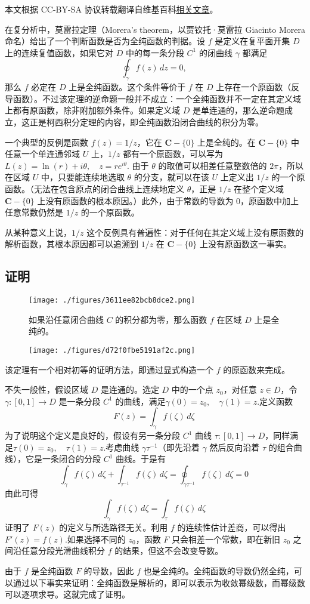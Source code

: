 
本文根据 CC-BY-SA 协议转载翻译自维基百科\href{https://en.wikipedia.org/wiki/Morera\%27s_theorem}{相关文章}。

在复分析中，莫雷拉定理（Morera's theorem，以贾钦托·莫雷拉 Giacinto Morera 命名）给出了一个判断函数是否为全纯函数的判据。设 $f$ 是定义在复平面开集 $D$ 上的连续复值函数，如果它对 $D$ 中的每一条分段 $C^1$ 的闭曲线 $\gamma$ 都满足
$$
\oint_{\gamma} f(z)\,dz = 0,~
$$
那么 $f$ 必定在 $D$ 上是全纯函数。这个条件等价于 $f$ 在 $D$ 上存在一个原函数（反导函数）。不过该定理的逆命题一般并不成立：一个全纯函数并不一定在其定义域上都有原函数，除非附加额外条件。如果定义域 $D$ 是单连通的，那么逆命题成立，这正是柯西积分定理的内容，即全纯函数沿闭合曲线的积分为零。

一个典型的反例是函数 $f(z) = 1/z$，它在 $\mathbf{C} - \{0\}$ 上是全纯的。在 $\mathbf{C} - \{0\}$ 中任意一个单连通邻域 $U$ 上，$1/z$ 都有一个原函数，可以写为$L(z) = \ln(r) + i\theta, \quad z = re^{i\theta}$.
由于 $\theta$ 的取值可以相差任意整数倍的 $2\pi$，所以在区域 $U$ 中，只要能连续地选取 $\theta$ 的分支，就可以在该 $U$ 上定义出 $1/z$ 的一个原函数。（无法在包含原点的闭合曲线上连续地定义 $\theta$，正是 $1/z$ 在整个定义域 $\mathbf{C} - \{0\}$ 上没有原函数的根本原因。）此外，由于常数的导数为 0，原函数中加上任意常数仍然是 $1/z$ 的一个原函数。

从某种意义上说，$1/z$ 这个反例具有普遍性：对于任何在其定义域上没有原函数的解析函数，其根本原因都可以追溯到 $1/z$ 在 $\mathbf{C} - \{0\}$ 上没有原函数这一事实。
\subsection{证明}
\begin{figure}[ht]
\centering
\texttt{[image: ./figures/3611ee82bcb8dce2.png]}
\caption{如果沿任意闭合曲线 $C$ 的积分都为零，那么函数 $f$ 在区域 $D$ 上是全纯的。} \label{fig_MLLdl_1}
\end{figure}
\begin{figure}[ht]
\centering
\texttt{[image: ./figures/d72f0fbe5191af2c.png]}
\caption{} \label{fig_MLLdl_2}
\end{figure}
该定理有一个相对初等的证明方法，即通过显式构造一个 $f$ 的原函数来完成。

不失一般性，假设区域 $D$ 是连通的。选定 $D$ 中的一个点 $z_0$，对任意 $z \in D$，令 $\gamma: [0,1] \to D$ 是一条分段 $C^1$ 的曲线，满足$\gamma(0) = z_0, \quad \gamma(1) = z$.定义函数
$$
F(z) = \int_{\gamma} f(\zeta)\,d\zeta~
$$
为了说明这个定义是良好的，假设有另一条分段 $C^1$ 曲线 $\tau: [0,1] \to D$，同样满足$\tau(0) = z_0, \quad \tau(1) = z$.考虑曲线 $\gamma \tau^{-1}$（即先沿着 $\gamma$ 然后反向沿着 $\tau$ 的组合曲线），它是一条闭合的分段 $C^1$ 曲线。于是有
$$
\int_{\gamma} f(\zeta)\,d\zeta + \int_{\tau^{-1}} f(\zeta)\,d\zeta
= \oint_{\gamma \tau^{-1}} f(\zeta)\,d\zeta
= 0~
$$
由此可得
$$
\int_{\gamma} f(\zeta)\,d\zeta = \int_{\tau} f(\zeta)\,d\zeta~
$$
证明了 $F(z)$ 的定义与所选路径无关。利用 $f$ 的连续性估计差商，可以得出$
F'(z) = f(z)$.如果选择不同的 $z_0$，函数 $F$ 只会相差一个常数，即在新旧 $z_0$ 之间沿任意分段光滑曲线积分 $f$ 的结果，但这不会改变导数。

由于 $f$ 是全纯函数 $F$ 的导数，因此 $f$ 也是全纯的。全纯函数的导数仍然全纯，可以通过以下事实来证明：全纯函数是解析的，即可以表示为收敛幂级数，而幂级数可以逐项求导。这就完成了证明。
